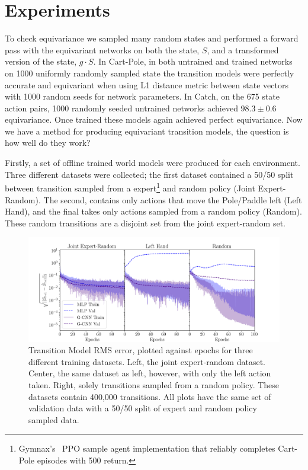 \documentclass[mlabstract]{jmlr}
\begin{document}
\vspace{-10}
\section{Experiments}

To check equivariance we sampled many random states and performed a forward pass with the equivariant networks  on both the state, $S$, and a transformed version of the state, $g \cdot S$. In Cart-Pole, in both untrained and trained networks on 1000 uniformly randomly sampled state the transition models were perfectly accurate and equivariant when using L1 distance metric between state vectors with 1000 random seeds for network parameters. In Catch, on the 675 state action pairs, 1000 randomly seeded untrained networks achieved $98.3 \pm 0.6$ equivariance. Once trained these models again achieved perfect equivariance. Now we have a method for producing equivariant transition models, the question is how well do they work?

Firstly, a set of offline trained world models were produced for each environment. Three different datasets were collected; the first dataset contained a 50/50 split between transition sampled from a expert\footnote{Gymnax's~\cite{lu2022discovered} PPO sample agent implementation that reliably completes Cart-Pole episodes with 500 return.} and random policy (Joint Expert-Random). The second, contains only actions that move the Pole/Paddle left (Left Hand), and the final takes only actions sampled from a random policy (Random). These random transitions are a disjoint set from the joint expert-random set.

\vspace{-10}
\begin{figure}
	\centering
	\includegraphics[width=.65\textwidth]{Figures/transition_model_loss.png}
	\caption{Transition Model RMS error, plotted against epochs for three different training
		datasets. Left, the joint expert-random dataset. Center, the same dataset as
		left, however, with only the left action taken. Right, solely transitions sampled
		from a random policy. These datasets contain 400,000 transitions. All plots have
		the same set of validation data with a 50/50 split of expert and random policy
		sampled data.}\label{fig:tm_cp}
\end{figure}
\end{document}
